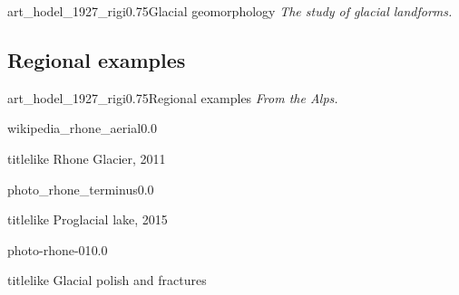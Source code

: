 
    \begin{sectionframe}{art_hodel_1927_rigi}{0.75}{Glacial geomorphology}
      \emph{The study of glacial landforms.}
    \end{sectionframe}


\subsection{Regional examples}

    \begin{sectionframe}{art_hodel_1927_rigi}{0.75}{Regional examples}
      \emph{From the Alps.}
    \end{sectionframe}


    \begin{backgroundframe}[b]{wikipedia_rhone_aerial}{0.0}{}
      \begin{beamercolorbox}[sep=1em,wd=45mm]{titlelike}
        Rhone Glacier, 2011
      \end{beamercolorbox}
    \end{backgroundframe}

    \begin{backgroundframe}[b]{photo_rhone_terminus}{0.0}{}
      \begin{beamercolorbox}[sep=1em,wd=45mm]{titlelike}
        Proglacial lake, 2015
      \end{beamercolorbox}
    \end{backgroundframe}

    \begin{backgroundframe}[b]{photo-rhone-01}{0.0}{}
      \begin{beamercolorbox}[sep=1em,wd=60mm]{titlelike}
        Glacial polish and fractures
      \end{beamercolorbox}
    \end{backgroundframe}

